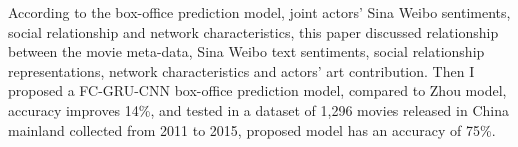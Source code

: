 \documentclass[review]{cvpr}
\begin{document}
According to the box-office prediction model, joint actors' Sina Weibo sentiments, social relationship and network characteristics,
this paper discussed relationship between the movie meta-data, Sina Weibo text sentiments, social relationship representations, network characteristics and actors' art contribution.
Then I proposed a FC-GRU-CNN box-office prediction model, compared to Zhou \etal model, accuracy improves 14\%,
and tested in a dataset of 1,296 movies released in China mainland collected from 2011 to 2015, proposed model has an accuracy of 75\%.

{\small


}
\end{document}
